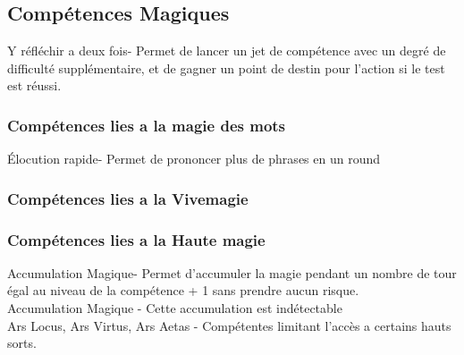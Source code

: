 \subsection{Compétences Magiques}
Y réfléchir a deux fois\Spe - Permet de lancer un jet de compétence avec un degré de difficulté supplémentaire, 
et de gagner un point de destin pour l’action si le test est réussi.
\subsubsection{Compétences lies a la magie des mots}
Élocution rapide\Spe - Permet de prononcer plus de phrases en un round
\subsubsection{Compétences lies a la Vivemagie}
\subsubsection{Compétences lies a la Haute magie}
Accumulation Magique\Spe - Permet d’accumuler la magie pendant un nombre de tour égal au niveau de la compétence + 1 sans prendre aucun risque.\\
Accumulation Magique\Meta{} - Cette accumulation est indétectable\\
Ars Locus, Ars Virtus, Ars Aetas - Compétentes limitant l’accès a certains hauts sorts.\\